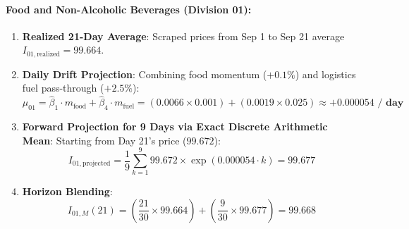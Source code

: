 \documentclass[a4paper, 11pt]{article}
\begin{document}
\paragraph{Food and Non-Alcoholic Beverages (Division 01):}
\begin{enumerate}[noitemsep]
    \item \textbf{Realized 21-Day Average}: Scraped prices from Sep 1 to Sep 21 average $I_{01, \text{realized}} = \mathbf{99.664}$.
    \item \textbf{Daily Drift Projection}: Combining food momentum ($+0.1\%$) and logistics fuel pass-through ($+2.5\%$):
    \begin{equation}
        \mu_{01} = \hat{\beta}_1 \cdot m_{\text{food}} + \hat{\beta}_4 \cdot m_{\text{fuel}} = (0.0066 \times 0.001) + (0.0019 \times 0.025) \approx \mathbf{+0.000054 \text{ / day}}
    \end{equation}
    \item \textbf{Forward Projection for 9 Days via Exact Discrete Arithmetic Mean}: Starting from Day 21's price ($99.672$):
    \begin{equation}
        I_{01, \text{projected}} = \frac{1}{9} \sum_{k=1}^9 99.672 \times \exp\left( 0.000054 \cdot k \right) = \mathbf{99.677}
    \end{equation}
    \item \textbf{Horizon Blending}:
    \begin{equation}
        I_{01, M}(21) = \left( \frac{21}{30} \times 99.664 \right) + \left( \frac{9}{30} \times 99.677 \right) = \mathbf{99.668}
    \end{equation}
\end{enumerate}
\end{document}
